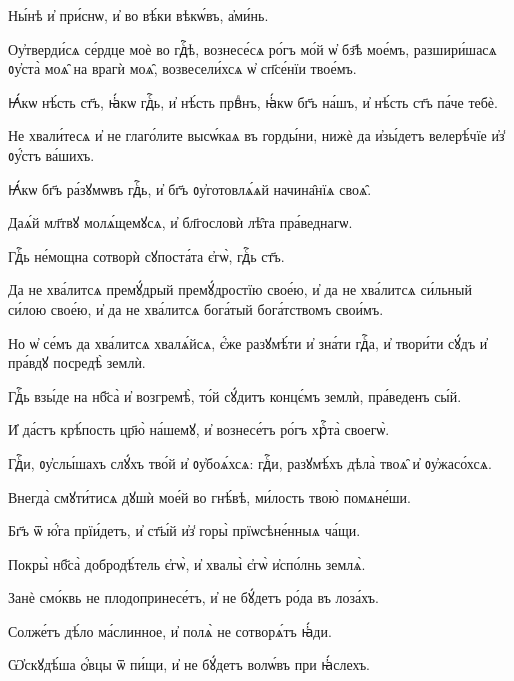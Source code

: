 \hKv Ны́нѣ и҆ при́снѡ, и҆ во вѣ́ки вѣкѡ́въ, а҆ми́нь. 

% 

\hKv Оу҆тверди́сѧ се́рдце моѐ во гдⷭ҇ѣ, вознесе́сѧ ро́гъ мо́й  ѡ҆ бз҃ѣ мое́мъ, разшири́шасѧ ᲂу҆ста̀ моѧ̑ на врагѝ моѧ̑,  возвесели́хсѧ ѡ҆ сп҃се́нїи твое́мъ. 

\hKv Ꙗ҆́кѡ нѣ́сть ст҃ъ, ꙗ҆́кѡ гдⷭ҇ь, и҆ нѣ́сть првⷣнъ,  ꙗ҆́кѡ бг҃ъ на́шъ, и҆ нѣ́сть ст҃ъ па́че тебѐ.  

\hKv Не хвали́тесѧ и҆ не глаго́лите высѡ́каѧ въ горды́ни, нижѐ  да и҆зы́детъ велерѣ́чїе и҆з̾ ᲂу҆́стъ ва́шихъ. 

\hKv Ꙗ҆́кѡ бг҃ъ ра́зꙋмѡвъ гдⷭ҇ь, и҆ бг҃ъ ᲂу҆готовлѧ́ѧй  начина̑нїѧ своѧ̑. 
%

\hKv Даѧ́й мл҃твꙋ молѧ́щемꙋсѧ, и҆ бл҃гословѝ лѣ̑та  пра́веднагѡ. 

\hKv Гдⷭ҇ь не́мощна сотворѝ сꙋпоста́та є҆гѡ̀, гдⷭ҇ь ст҃ъ. 
%

\hKv Да не хва́литсѧ премꙋ́дрый премꙋ́дростїю свое́ю, и҆  да не хва́литсѧ си́льный си́лою свое́ю, и҆ да не хва́литсѧ  бога́тый бога́тствомъ свои́мъ. 

\hKv Но ѡ҆ се́мъ да хва́литсѧ хвалѧ́йсѧ, є҆́же разꙋмѣ́ти и҆  зна́ти гдⷭ҇а, и҆ твори́ти сꙋ́дъ и҆ пра́вдꙋ посредѣ̀ землѝ. 
%

\hKv Гдⷭ҇ь взы́де на нб҃са̀ и҆ возгремѣ̀, то́й сꙋ́дитъ  концє́мъ землѝ, пра́веденъ сы́й. 

\hKv И҆ да́стъ крѣ́пость цр҃ю̀ на́шемꙋ, и҆ вознесе́тъ ро́гъ  хрⷭ҇та̀ своегѡ̀.  
%

%

\hKv Гдⷭ҇и, ᲂу҆слы́шахъ слꙋ́хъ тво́й и҆ ᲂу҆боѧ́хсѧ: гдⷭ҇и,  разꙋмѣ́хъ дѣла̀ твоѧ̑ и҆ ᲂу҆жасо́хсѧ. 

\hKv Внегда̀ смꙋти́тисѧ дꙋшѝ мое́й во гнѣ́вѣ, ми́лость твою̀  помѧне́ши. 

\hKv Бг҃ъ ѿ ю҆́га прїи́детъ, и҆ ст҃ы́й и҆з̾ горы̀  прїѡсѣне́нныѧ ча́щи. 

\hKv Покры̀ нб҃са̀ добродѣ́тель є҆гѡ̀, и҆ хвалы̀  є҆гѡ̀  и҆спо́лнь землѧ̀. 
%

\hKv Занѐ смо́квь не плодопринесе́тъ, и҆ не бꙋ́детъ ро́да  въ лоза́хъ. 

\hKv Солже́тъ дѣ́ло ма́слинное, и҆ полѧ̀ не сотворѧ́тъ ꙗ҆́ди. 
%

\hKv Ѡ҆скꙋдѣ́ша ѻ҆́вцы ѿ пи́щи, и҆ не бꙋ́детъ волѡ́въ  при ꙗ҆́слехъ. 

